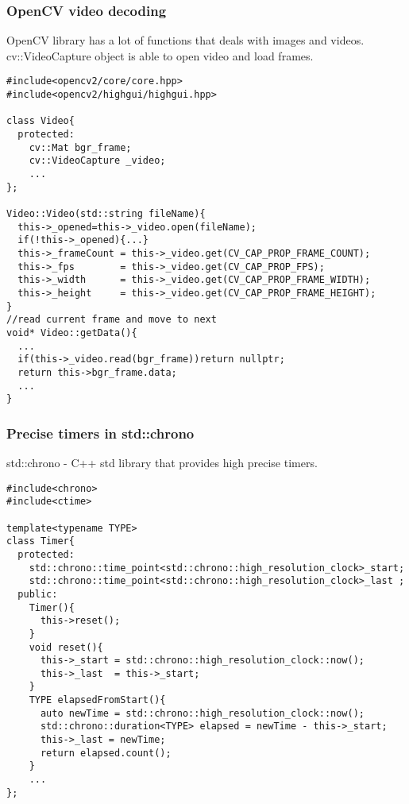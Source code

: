 \begin{frame}[fragile]
\frametitle{OpenCV video decoding}
  OpenCV library has a lot of functions that deals with images and videos.
  cv::VideoCapture object is able to open video and load frames.
  {\scriptsize
  \begin{verbatim}
#include<opencv2/core/core.hpp>
#include<opencv2/highgui/highgui.hpp>

class Video{
  protected:
    cv::Mat bgr_frame;
    cv::VideoCapture _video;
    ...
};

Video::Video(std::string fileName){
  this->_opened=this->_video.open(fileName);
  if(!this->_opened){...}
  this->_frameCount = this->_video.get(CV_CAP_PROP_FRAME_COUNT);
  this->_fps        = this->_video.get(CV_CAP_PROP_FPS);
  this->_width      = this->_video.get(CV_CAP_PROP_FRAME_WIDTH);
  this->_height     = this->_video.get(CV_CAP_PROP_FRAME_HEIGHT);
}
//read current frame and move to next
void* Video::getData(){
  ...
  if(this->_video.read(bgr_frame))return nullptr;
  return this->bgr_frame.data;
  ...
}
  \end{verbatim}
  }
\end{frame}

\begin{frame}[fragile]
\frametitle{Precise timers in std::chrono}
  std::chrono - C++ std library that provides high precise timers.
  {\scriptsize
  \begin{verbatim}
#include<chrono>
#include<ctime>

template<typename TYPE>
class Timer{
  protected:
    std::chrono::time_point<std::chrono::high_resolution_clock>_start;
    std::chrono::time_point<std::chrono::high_resolution_clock>_last ;
  public:
    Timer(){
      this->reset();
    }
    void reset(){
      this->_start = std::chrono::high_resolution_clock::now();
      this->_last  = this->_start;
    }
    TYPE elapsedFromStart(){
      auto newTime = std::chrono::high_resolution_clock::now();
      std::chrono::duration<TYPE> elapsed = newTime - this->_start;
      this->_last = newTime;
      return elapsed.count();
    }
    ...
};
  \end{verbatim}
  }
\end{frame}

